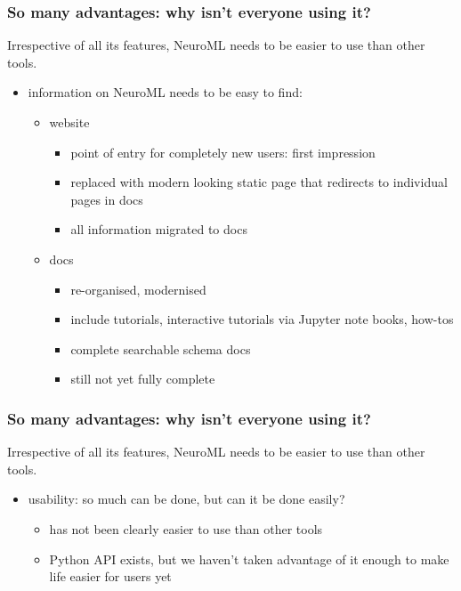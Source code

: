 \begin{frame}[t]
  \frametitle{So many advantages: why isn't everyone using it?}
  \pause{}
  Irrespective of all its features, NeuroML \alert{needs to be easier to use than other tools}.\\
  \pause{}%
  \begin{itemize}
    \item information on NeuroML needs to be easy to find:
      \begin{itemize}
        \item website
          \begin{itemize}
            \item point of entry for completely new users: first impression
            \item replaced with modern looking static page that redirects to individual pages in docs
            \item all information migrated to docs
          \end{itemize}
          \pause{}
        \item docs
          \begin{itemize}
            \item re-organised, modernised
            \item include tutorials, interactive tutorials via Jupyter note books, how-tos
            \item complete searchable schema docs
            \item still not yet fully complete
          \end{itemize}
      \end{itemize}
  \end{itemize}
\end{frame}
\begin{frame}[t]
  \frametitle{So many advantages: why isn't everyone using it?}
  Irrespective of all its features, NeuroML \alert{needs to be easier to use than other tools}.\\
  \begin{itemize}
    \item usability: so much can be done, but can it be done \alert{easily}?
      \begin{itemize}
        \item has not been clearly easier to use than other tools
        \item Python API exists, but we haven't taken advantage of it enough to \alert{make life easier for users} yet
      \end{itemize}
  \end{itemize}
\end{frame}
